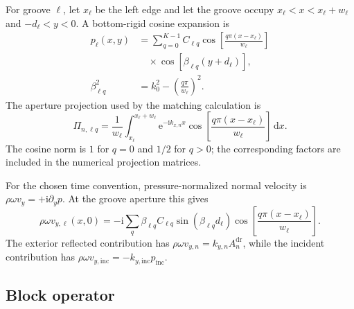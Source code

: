 \documentclass[aps,prl,reprint,superscriptaddress,nofootinbib,floatfix]{revtex4-2}
\newcommand{\dd}{\,\mathrm{d}}
\newcommand{\ii}{\mathrm{i}}
\newcommand{\e}{\mathrm{e}}
\providecommand{\dr}{\mathrm{dr}}
\providecommand{\inc}{\mathrm{inc}}
\begin{document}
For groove $\ell$, let $x_\ell$ be the left edge and let the groove occupy
$x_\ell<x<x_\ell+w_\ell$ and $-d_\ell<y<0$.  A bottom-rigid cosine expansion
is
\begin{equation}
\begin{aligned}
 p_\ell(x,y)&=\sum_{q=0}^{K-1} C_{\ell q}
 \cos\!\left[\frac{q\pi(x-x_\ell)}{w_\ell}\right]\\[-2pt]
 &\quad\times\cos\!\left[\beta_{\ell q}(y+d_\ell)\right],\\
 \beta_{\ell q}^2&=k_0^2-\left(\frac{q\pi}{w_\ell}\right)^2 .
\end{aligned}
 \label{eq:s-groove}
\end{equation}
The aperture projection used by the matching calculation is
\begin{equation}
 \Pi_{n,\ell q}=\frac{1}{w_\ell}\int_{x_\ell}^{x_\ell+w_\ell}
 \e^{-\ii k_{x,n}x}
 \cos\!\left[\frac{q\pi(x-x_\ell)}{w_\ell}\right]\dd x .
 \label{eq:s-projection}
\end{equation}
The cosine norm is $1$ for $q=0$ and $1/2$ for $q>0$; the corresponding
factors are included in the numerical projection matrices.

For the chosen time convention, pressure-normalized normal velocity is
$\rho\omega v_y=+\ii\partial_y p$.  At the groove aperture this gives
\begin{equation}
 \rho\omega v_{y,\ell}(x,0)=
 -\ii\sum_q \beta_{\ell q} C_{\ell q}
 \sin(\beta_{\ell q}d_\ell)
 \cos\!\left[\frac{q\pi(x-x_\ell)}{w_\ell}\right].
 \label{eq:s-groove-velocity}
\end{equation}
The exterior reflected contribution has
$\rho\omega v_{y,n}=k_{y,n}A_n^{\dr}$, while the incident contribution has
$\rho\omega v_{y,\inc}=-k_{y,\inc}p_{\inc}$.

\subsection{Block operator}
\label{sec:s-block}
\end{document}
